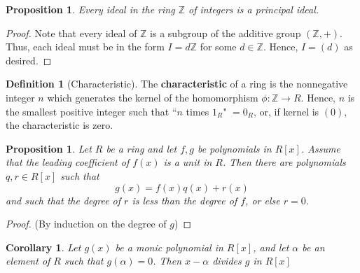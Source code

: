 \documentclass[12pt]{article}
\newtheorem{cor}[thm]{Corollary}
\newtheorem{prop}[thm]{Proposition}
\theoremstyle{definition}
\newtheorem{defn}[thm]{Definition}
\theoremstyle{remark}
\numberwithin{equation}{section}
\newcommand\Z{\mathbb Z}    %
\newcommand\B[1]{\textbf{ #1}}
\begin{document}
\vspace{15pt}

\begin{prop}
        Every ideal in the ring $\Z$ of integers is a principal ideal.
\end{prop}
\begin{proof}
        Note that every ideal of $\Z$ is a subgroup of the additive group $(\Z,+)$. Thus, each ideal must be in the form $I = d\Z$ for some $d \in \Z$. Hence, $I = (d)$ as desired.
\end{proof}

\vspace{15pt}

\begin{defn}[Characteristic]
        The \B{characteristic} of a ring is the nonnegative integer $n$ which generates the kernel of the homomorphism $\phi:\Z\rightarrow R$. Hence, $n$ is the smallest positive integer such that ``$n$ times $1_R$" $= 0_R$, or, if kernel is $(0)$, the characteristic is zero.
\end{defn}

\vspace{15pt}

\begin{prop}
        Let $R$ be a ring and let $f,g$ be polynomials in $R[x]$. Assume that the leading coefficient of $f(x)$ is a unit in $R$. Then there are polynomials $q,r \in R[x]$ such that \begin{equation}
                g(x) = f(x)q(x) + r(x)
        \end{equation}
        and such that the degree of $r$ is less than the degree of $f$, or else $r = 0$.
\end{prop}
\begin{proof}
        (By induction on the degree of $g$)
\end{proof}


\vspace{15pt}

\begin{cor}
        Let $g(x)$ be a monic polynomial in $R[x]$, and let $\alpha$ be an element of $R$ such that $g(\alpha) = 0$. Then $x-\alpha$ divides $g$ in $R[x]$
\end{cor}

\vspace{15pt}
\end{document}
